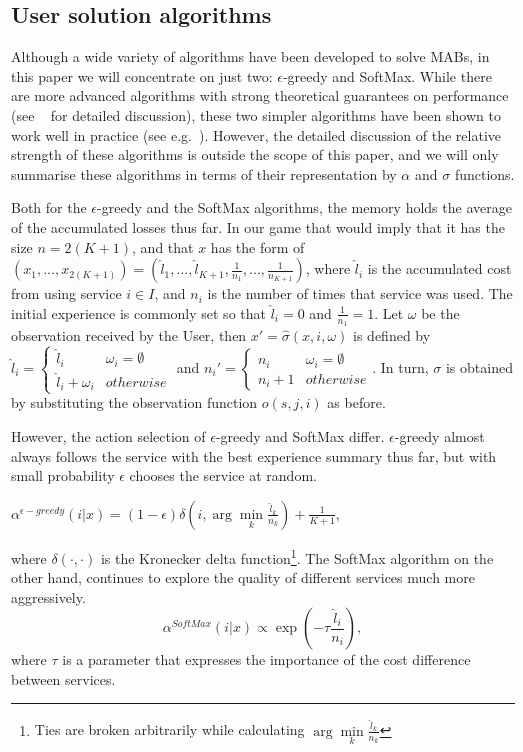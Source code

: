 \documentclass{msdm2012}
\begin{document}
\subsection{User solution algorithms}
Although a wide variety of algorithms have been developed to solve
MABs, in this paper we will concentrate on just two: $\epsilon$-greedy
and SoftMax. While there are more advanced algorithms with strong
theoretical guarantees on performance (see
~\cite{cesa-bianchi_lugosi_2006_book} for detailed discussion), these
two simpler algorithms have been shown to work well in practice (see
e.g.~\cite{kuleshov_precup_2010}). However, the detailed discussion of
the relative strength of these algorithms is outside the scope of this
paper, and we will only summarise these algorithms in terms of their
representation by $\alpha$ and $\sigma$ functions.

Both for the $\epsilon$-greedy and the SoftMax algorithms, the memory
holds the average of the accumulated losses thus far. In our game that
would imply that it has the size $n=2(K+1)$, and that $x$ has the form
of
$(x_1,...,x_{2(K+1)})=(\widehat{l}_1,...,\widehat{l}_{K+1},\frac{1}{n_1},...,\frac{1}{n_{K+1}})$,
where $\widehat{l}_i$ is the accumulated cost from using service $i\in
I$, and $n_i$ is the number of times that service was used. The
initial experience is commonly set so that $\widehat{l}_i=0$ and
$\frac{1}{n_1}=1$. Let $\omega$ be the observation received by the
User, then $x'=\widehat{\sigma}(x,i,\omega)$ is
defined by
$%
\widehat{l}_i=\begin{cases}\widehat{l}_i&\omega_i=\emptyset\\ \widehat{l}_i+\omega_i&otherwise\end{cases}$ and $%
n_i'=\begin{cases}n_i&\omega_i=\emptyset\\n_i+1&otherwise\end{cases}$. In
turn, $\sigma$ is obtained by substituting the observation function
$o(s,j,i)$ as before.

However, the action selection of $\epsilon$-greedy and SoftMax
differ. $\epsilon$-greedy almost always follows the service with the
best experience summary thus far, but with small probability
$\epsilon$ chooses the service at
random.\\
\centerline{$\alpha^{\epsilon-greedy}(i|x)=
(1-\epsilon)\delta\left(i,\arg\min\limits_{k}\frac{\widehat{l}_k}{n_k}\right)+\frac{1}{K+1},$}
where $\delta(\cdot,\cdot)$ is the Kronecker delta
function\footnote{Ties are broken arbitrarily while calculating
  $\arg\min\limits_{k}\frac{\widehat{l}_k}{n_k}$}. The SoftMax
algorithm on the other hand, continues to explore the quality of
different services much more aggressively.
$$ \alpha^{SoftMax}(i|x)\propto
\exp(-\tau\frac{\widehat{l}_i}{n_i}),
$$ where $\tau$ is a parameter that expresses the importance of the
cost difference between services.
\end{document}
